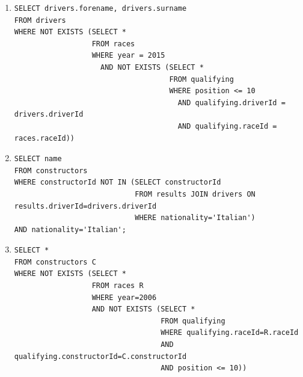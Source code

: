 \documentclass[a4paper]{article}
\begin{document}
\begin{enumerate}
    \item %
    \begin{verbatim}  
SELECT drivers.forename, drivers.surname
FROM drivers
WHERE NOT EXISTS (SELECT *
                  FROM races
                  WHERE year = 2015
                    AND NOT EXISTS (SELECT *
                                    FROM qualifying
                                    WHERE position <= 10
                                      AND qualifying.driverId = drivers.driverId
                                      AND qualifying.raceId = races.raceId))
    \end{verbatim}
            
    \item %
    \begin{verbatim}  
SELECT name
FROM constructors
WHERE constructorId NOT IN (SELECT constructorId
                            FROM results JOIN drivers ON results.driverId=drivers.driverId
                            WHERE nationality='Italian')
AND nationality='Italian';

    \end{verbatim}
            
    \item %
    \begin{verbatim}  
SELECT *
FROM constructors C
WHERE NOT EXISTS (SELECT *
                  FROM races R
                  WHERE year=2006
                  AND NOT EXISTS (SELECT *
                                  FROM qualifying
                                  WHERE qualifying.raceId=R.raceId
                                  AND qualifying.constructorId=C.constructorId
                                  AND position <= 10))  

    \end{verbatim}


\end{enumerate}
\end{document}
